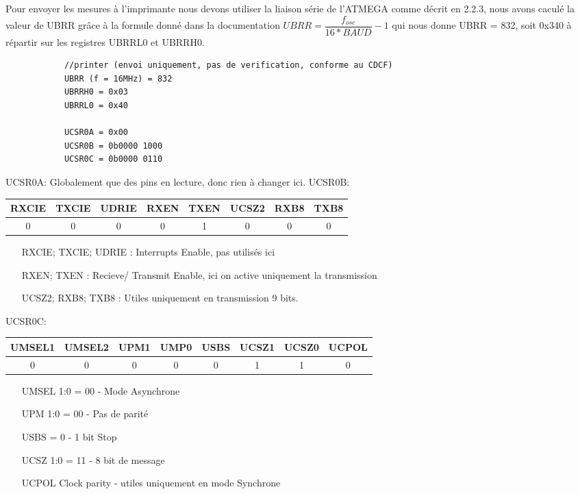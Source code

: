 \documentclass[a4paper, 12pt]{article}
\begin{document}
		Pour envoyer les mesures à l'imprimante nous devons utiliser la liaison série de l'ATMEGA comme décrit en 2.2.3, nous avons caculé la valeur de UBRR grâce à la formule donné dans la documentation $UBRR = \dfrac{f_{osc}}{16*BAUD} - 1$ qui nous donne UBRR = 832, soit 0x340 à répartir sur les registres UBRRL0 et UBRRH0.
		\begin{lstlisting}
			//printer (envoi uniquement, pas de verification, conforme au CDCF)
			UBRR (f = 16MHz) = 832
			UBRRH0 = 0x03
			UBRRL0 = 0x40
			
			UCSR0A = 0x00
			UCSR0B = 0b0000 1000
			UCSR0C = 0b0000 0110			
		\end{lstlisting}
		UCSR0A:
			Globalement que des pins en lecture, donc rien à changer ici.	
		UCSR0B:
		\begin{center}
			\begin{tabular}{|c|c|c|c|c|c|c|c|}
				\hline
				RXCIE & TXCIE & UDRIE & RXEN & TXEN & UCSZ2 & RXB8 & TXB8\\
				\hline
				0 & 0 & 0 & 0 & 1 & 0 & 0 & 0\\
				\hline
			\end{tabular}
		\end{center}
		\begin{itemize}
			\item[RXCIE; TXCIE; UDRIE] : Interrupts Enable, pas utilisés ici
			\item[RXEN; TXEN] : Recieve/ Transmit Enable, ici on active uniquement la transmission
			\item[UCSZ2; RXB8; TXB8] : Utiles uniquement en transmission 9 bits.
		\end{itemize}
	
		\newpage
		UCSR0C:
		\begin{center}
			\begin{tabular}{|c|c|c|c|c|c|c|c|}
				\hline
				UMSEL1 & UMSEL2 & UPM1 & UMP0 & USBS & UCSZ1 & UCSZ0 & UCPOL\\
				\hline
				0 & 0 & 0 & 0 & 0 & 1 & 1 & 0\\
				\hline
			\end{tabular}
		\end{center}
		\begin{itemize}
			\item[UMSEL 1:0] = 00 - Mode Asynchrone
			\item[UPM 1:0] = 00 - Pas de parité
			\item[USBS] = 0 - 1 bit Stop
			\item[UCSZ 1:0] = 11 - 8 bit de message
			\item[UCPOL] Clock parity - utiles uniquement en mode Synchrone
		\end{itemize}
	
\end{document}
